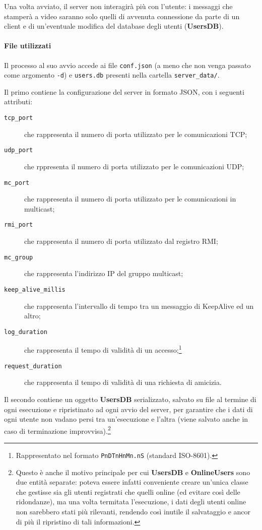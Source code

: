 \documentclass[11pt]{article}
\begin{document}
Una volta avviato, il server non interagirà più con l'utente: i messaggi che
stamperà a video saranno solo quelli di avvenuta connessione da parte di un
client e di un'eventuale modifica del database degli utenti ({\bf UsersDB}).

\paragraph{File utilizzati} Il processo al suo avvio accede ai file
{\tt conf.json} (a meno che non venga passato come argomento {\tt -d}) e
{\tt users.db} presenti nella cartella {\tt server\_data/}.

Il primo contiene la configurazione del server in formato JSON, con i seguenti
attributi:

\begin{description}
	\item[{\tt tcp\_port}] che rappresenta il numero di porta utilizzato per le
	comunicazioni TCP;
	\item[{\tt udp\_port}] che rppresenta il numero di porta utilizzato per le
	comunicazioni UDP;
	\item[{\tt mc\_port}] che rappresenta il numero di porta utilizzato per le
	comunicazioni in multicast;
	\item[{\tt rmi\_port}] che rappresenta il numero di porta utilizzato dal
	registro RMI;
	\item[{\tt mc\_group}] che rappresenta l'indirizzo IP del gruppo multicast;
	\item[{\tt keep\_alive\_millis}] che rappresenta l'intervallo di tempo tra
	un messaggio di	KeepAlive ed un altro;
	\item[{\tt log\_duration}] che rappresenta il tempo di validità di un
	accesso;\footnote{Rappresentato nel formato {\tt PnDTnHnMn.nS} (standard
	ISO-8601).}
	\item[{\tt request\_duration}] che rappresenta il tempo di validità di una
	richiesta di amicizia.\footnotemark[\value{footnote}]
\end{description}

Il secondo contiene un oggetto {\bf UsersDB} serializzato, salvato su file al
termine di ogni esecuzione e ripristinato ad ogni avvio del server, per
garantire che i dati di ogni utente non vadano persi tra un'esecuzione e l'altra
(viene salvato anche in caso di terminazione improvvisa).\footnote{Questo è
anche il motivo principale per cui {\bf UsersDB} e {\bf OnlineUsers} sono due
entità separate: poteva essere infatti conveniente creare un'unica classe che
gestisse sia gli utenti registrati che quelli online (ed evitare così delle
ridondanze), ma una volta termitata l'esecuzione, i dati degli utenti online non
sarebbero stati più rilevanti, rendendo così inutile il salvataggio e ancor di
più il ripristino di tali informazioni.}
\end{document}
